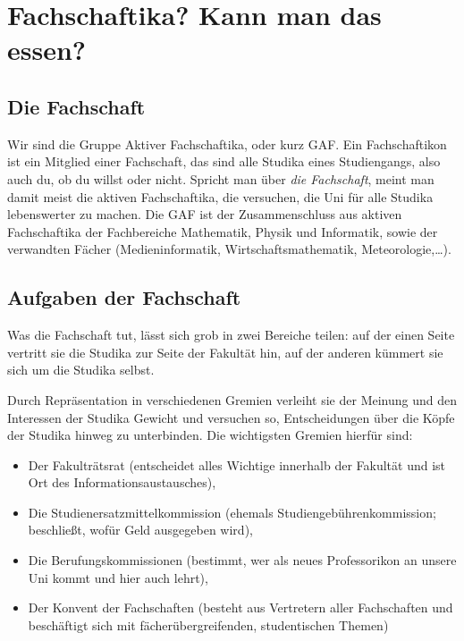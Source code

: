 \chapter{Fachschaftika? Kann man das essen?}

\section{Die Fachschaft}
Wir sind die Gruppe Aktiver Fachschaftika, oder kurz GAF. Ein Fachschaftikon ist ein Mitglied einer Fachschaft, das sind alle Studika eines Studiengangs, also auch du, ob du willst oder nicht. Spricht man über \emph{die Fachschaft}, meint man damit meist die aktiven Fachschaftika, die versuchen, die Uni für alle Studika lebenswerter zu machen. Die GAF ist der Zusammenschluss aus aktiven Fachschaftika der Fachbereiche Mathematik, Physik und Informatik, sowie der verwandten Fächer (Medieninformatik, Wirtschaftsmathematik, Meteorologie,\ldots).

\section{Aufgaben der Fachschaft}

Was die Fachschaft tut, lässt sich grob in zwei Bereiche teilen: auf der einen Seite vertritt sie die Studika zur Seite der Fakultät hin, auf der anderen kümmert sie sich um die Studika selbst.

Durch Repräsentation in verschiedenen Gremien verleiht sie der Meinung und den Interessen der Studika Gewicht und versuchen so, Entscheidungen über die Köpfe der Studika hinweg zu unterbinden. Die wichtigsten Gremien hierfür sind:
\begin{itemize}
\item Der Fakulträtsrat (entscheidet alles Wichtige innerhalb der Fakultät und ist Ort des Informationsaustausches),
\item Die Studienersatzmittelkommission (ehemals Studiengebührenkommission; beschließt, wofür Geld ausgegeben wird),
\item Die Berufungskommissionen (bestimmt, wer als neues Professorikon an unsere Uni kommt und hier auch lehrt),
\item Der Konvent der Fachschaften (besteht aus Vertretern aller Fachschaften und beschäftigt sich mit fächerübergreifenden, studentischen Themen)
\end{itemize}

